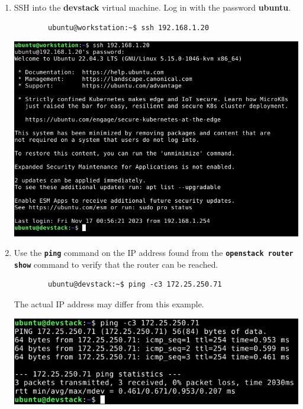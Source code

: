 \documentclass[letterpaper, 12pt]{article}
\begin{document}
\begin{enumerate}
    \item SSH into the \textbf{devstack} virtual machine. Log in with the password \textbf{ubuntu}.
    \begin{lstlisting}
        ubuntu@workstation:~$ ssh 192.168.1.20
    \end{lstlisting}

    \begin{center}
        \includegraphics[width=\linewidth]{images/part2/step17.png}
    \end{center}

    \item Use the \textbf{\texttt{ping}} command on the IP address found from the
    \textbf{\texttt{openstack router show}} command to verify that the router can be reached.
    \begin{lstlisting}
        ubuntu@devstack:~$ ping -c3 172.25.250.71
    \end{lstlisting}

    \begin{notebox}
        The actual IP address may differ from this example.
    \end{notebox}

    \begin{center}
        \includegraphics[width=\linewidth]{images/part2/step18.png}
    \end{center}


\end{enumerate}
\end{document}

